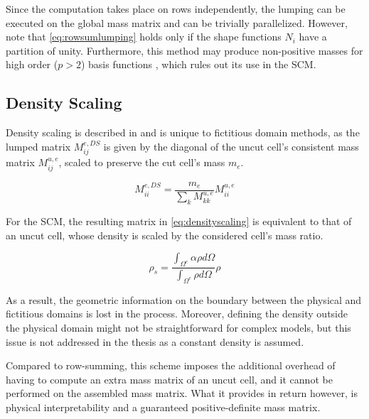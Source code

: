 Since the computation takes place on rows independently, the lumping can be executed
on the global mass matrix and can be trivially parallelized. However, note that
\ref{eq:rowsumlumping} holds only if the shape functions $N_i$ have a partition
of unity. Furthermore, this method may produce non-positive masses for high order ($p>2$)
basis functions \cite{Duczek2014}, which rules out its use in the SCM.

%
\subsection{Density Scaling}
\label{section:?lumping}
%

Density scaling is described in \cite{Joulaian2014} and is unique to fictitious
domain methods, as the lumped matrix $M_{ij}^{e,DS}$ is given by the diagonal of the uncut cell's
consistent mass matrix $M_{ij}^{u,e}$, scaled to preserve the cut cell's mass $m_e$.

\begin{equation} \label{eq:densityscaling}
	M_{ii}^{e,DS} =
		\frac{m_e}{\sum_k M_{kk}^{u,e}} M_{ii}^{u,e}
\end{equation}

For the SCM, the resulting matrix in \ref{eq:densityscaling} is equivalent
to that of an uncut cell, whose density is scaled by the considered cell's mass ratio.

\begin{equation} \label{eq:scaleddensity}
	\rho_s = \frac{\int_{\Omega^e} \alpha \rho d\Omega}{\int_{\Omega^e} \rho d\Omega} \rho
\end{equation}

As a result, the geometric information on the boundary between the physical
and fictitious domains is lost in the process. Moreover, defining the density
outside the physical domain might not be straightforward for complex models, but
this issue is not addressed in the thesis as a constant density is assumed.

Compared to row-summing, this scheme imposes the additional overhead of having
to compute an extra mass matrix of an uncut cell, and it cannot be performed
on the assembled mass matrix. What it provides in return however, is physical
interpretability and a guaranteed positive-definite mass matrix.

%
